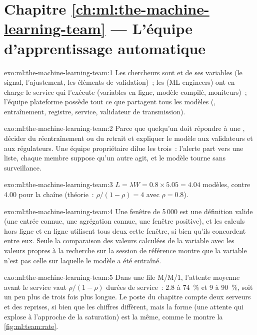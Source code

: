 \section*{Chapitre \ref{ch:ml:the-machine-learning-team} --- L'équipe d'apprentissage automatique}

\begin{solution}{exo:ml:the-machine-learning-team:1}
Les chercheurs sont  et de ses variables (le signal, l'ajustement, les éléments de validation)~; les  (ML engineers) ont en charge le
service qui l'exécute (variables en ligne, modèle compilé, moniteurs)~; l'équipe plateforme possède tout ce que partagent tous les modèles (,
entraînement, registre, service, validateur de transmission).
\end{solution}

\begin{solution}{exo:ml:the-machine-learning-team:2}
Parce que quelqu'un doit répondre à une , décider du réentraînement ou du retrait et expliquer le modèle aux validateurs et
aux régulateurs. Une équipe propriétaire dilue les trois~: l'alerte part vers une liste, chaque membre suppose qu'un autre agit, et le modèle tourne
sans surveillance.
\end{solution}

\begin{solution}{exo:ml:the-machine-learning-team:3}
$L=\lambda W=0.8\times5.05=4.04$ modèles, contre 4.00 pour la chaîne (théorie~: $\rho/(1-\rho)=4$ avec $\rho=0.8$).
\end{solution}

\begin{solution}{exo:ml:the-machine-learning-team:4}
Une fenêtre de 5\,000 est une définition valide (une entrée connue, une agrégation connue, une fenêtre positive), et les calculs hors ligne et en ligne
utilisent tous deux cette fenêtre, si bien qu'ils concordent entre eux. Seule la comparaison des valeurs calculées de la variable avec les valeurs propres à la recherche
sur la session de référence montre que la variable n'est pas celle sur laquelle le modèle a été entraîné.
\end{solution}

\begin{solution}{exo:ml:the-machine-learning-team:5}
Dans une file M/M/1, l'attente moyenne avant le service vaut $\rho/(1-\rho)$ durées de service~: 2.8 à 74~\% et 9 à 90~\%, soit un peu plus de trois
fois plus longue. Le poste du chapitre compte deux serveurs et des reprises, si bien que les chiffres diffèrent, mais la forme (une attente qui explose à l'approche
de la saturation) est la même, comme le montre la \cref{fig:ml:team:rate}.
\end{solution}

